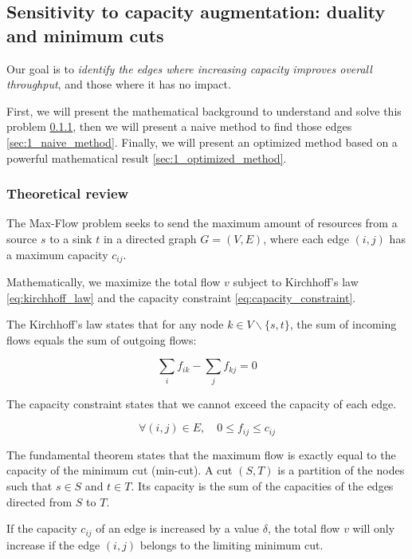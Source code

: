 \documentclass[12pt, openany]{article}
\begin{document}
\subsection{Sensitivity to capacity augmentation: duality and minimum cuts}\label{sec:partI}

Our goal is to \emph{identify the edges where increasing capacity improves overall throughput}, and those where it has no impact.

First, we will present the mathematical background to understand and solve this problem \ref{sec:1_theoretical_review}, then we will present a naive method to find those edges \ref{sec:1_naive_method}. Finally, we will present an optimized method based on a powerful mathematical result \ref{sec:1_optimized_method}.

\subsubsection{Theoretical review}\label{sec:1_theoretical_review}

The Max-Flow problem seeks to send the maximum amount of resources from a source $s$ to a sink $t$ in a directed graph $G=(V,E)$, where each edge $(i,j)$ has a maximum capacity $c_{ij}$.

Mathematically, we maximize the total flow $v$ subject to Kirchhoff's law \eqref{eq:kirchhoff_law} and the capacity constraint \eqref{eq:capacity_constraint}.

The Kirchhoff's law states that for any node $k \in V \backslash \{s,t\}$, the sum of incoming flows equals the sum of outgoing flows:

\begin{equation}\label{eq:kirchhoff_law}
    \sum_i f_{ik} - \sum_j f_{kj} = 0
\end{equation}

The capacity constraint states that we cannot exceed the capacity of each edge.

\begin{equation}\label{eq:capacity_constraint}
    \forall (i,j) \in E, \quad 0 \leq f_{ij} \leq c_{ij}
\end{equation}

The fundamental theorem states that the maximum flow is exactly equal to the capacity of the minimum cut (min-cut). A cut $(S,T)$ is a partition of the nodes such that $s \in S$ and $t\in T$. Its capacity is the sum of the capacities of the edges directed from $S$ to $T$.

If the capacity $c_{ij}$ of an edge is increased by a value $\delta$, the total flow $v$ will only increase if the edge $(i,j)$ belongs to the limiting minimum cut.
\end{document}
